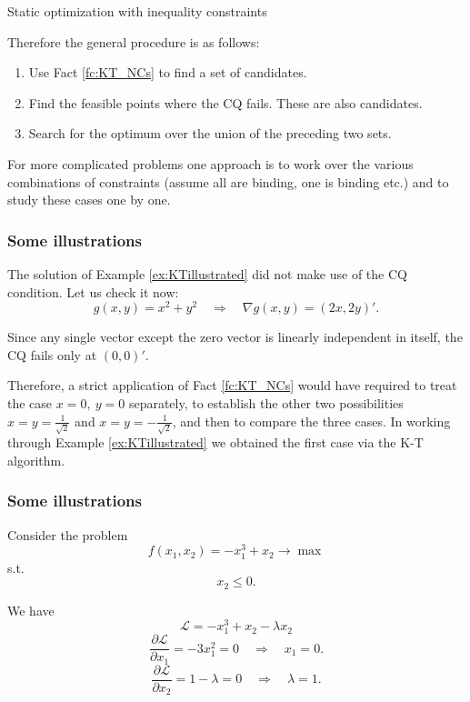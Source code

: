 \documentclass[10pt]{beamer}
\theoremstyle{definition}
\begin{document}
\begin{section}{Static optimization with inequality constraints}
\begin{frame}[fragile]
Therefore the general procedure is as follows:
\begin{enumerate}
\item Use Fact \ref{fc:KT_NCs} to find a set of candidates.
\item Find the feasible points where the CQ fails. These are also candidates.
\item Search for the optimum over the union of the preceding two sets.
\end{enumerate}\bigskip

For more complicated problems one approach is to work over the various combinations of constraints (assume all are binding, one is binding etc.) and to study these cases one by one.
\end{frame}

\begin{frame}[fragile]
\frametitle{Some illustrations}
\begin{example}
The solution of Example \ref{ex:KTillustrated} did not make use of the CQ condition. Let us check it now: \[ g(x,y)=x^2+y^2 \quad \Rightarrow \quad \nabla g(x,y) = (2x,2y)'. \]

Since any single vector except the zero vector is linearly independent in itself, the CQ fails only at $ (0,0)' $.

Therefore, a strict application of Fact \ref{fc:KT_NCs} would have required to treat the case $ x=0,~y=0 $ separately, to establish the other two possibilities $ x=y=\frac{1}{\sqrt{2}} $ and $ x=y=-\frac{1}{\sqrt{2}} $, and then to compare the three cases. In working through Example  \ref{ex:KTillustrated} we obtained the first case via the K-T algorithm.
\label{ex:revisitKTillustrated}
\end{example}\bigskip

\end{frame}

\begin{frame}[fragile]
\frametitle{Some illustrations}
\begin{example}
Consider the problem
\[ f(x_1,x_2) = -x_1^3+x_2 \rightarrow \max \]
s.t. \[ x_2\leq 0. \]

We have \[ \mathcal{L} =  -x_1^3+x_2 - \lambda x_2  \]
\[ \dfrac{\partial \mathcal{L}}{\partial x_1} = -3x_1^2 = 0 \quad \Rightarrow \quad x_1 = 0. \]
\[ \dfrac{\partial \mathcal{L}}{\partial x_2} = 1-\lambda = 0 \quad \Rightarrow \quad \lambda = 1. \]


\end{example}
\end{frame}
\end{section}
\end{document}
